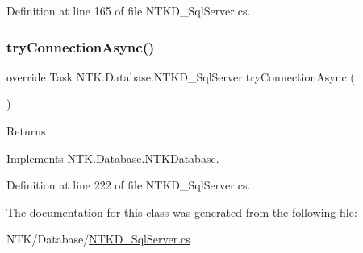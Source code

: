 Definition at line 165 of file N\+T\+K\+D\+\_\+\+Sql\+Server.\+cs.

\mbox{\label{class_n_t_k_1_1_database_1_1_n_t_k_d___sql_server_ae10ab9b2cb44ca086117cac435c5bff1}} 
\subsubsection{\texorpdfstring{tryConnectionAsync()}{tryConnectionAsync()}}
{\footnotesize\ttfamily override Task N\+T\+K.\+Database.\+N\+T\+K\+D\+\_\+\+Sql\+Server.\+try\+Connection\+Async (\begin{DoxyParamCaption}{ }\end{DoxyParamCaption})\hspace{0.3cm}{\ttfamily [virtual]}}





\begin{DoxyReturn}{Returns}

\end{DoxyReturn}


Implements \mbox{\hyperlink{class_n_t_k_1_1_database_1_1_n_t_k_database_a59d2820fbd047c1b11c73aabbf390ebb}{N\+T\+K.\+Database.\+N\+T\+K\+Database}}.



Definition at line 222 of file N\+T\+K\+D\+\_\+\+Sql\+Server.\+cs.



The documentation for this class was generated from the following file\+:\begin{DoxyCompactItemize}
\item 
N\+T\+K/\+Database/\mbox{\hyperlink{_n_t_k_d___sql_server_8cs}{N\+T\+K\+D\+\_\+\+Sql\+Server.\+cs}}\end{DoxyCompactItemize}
